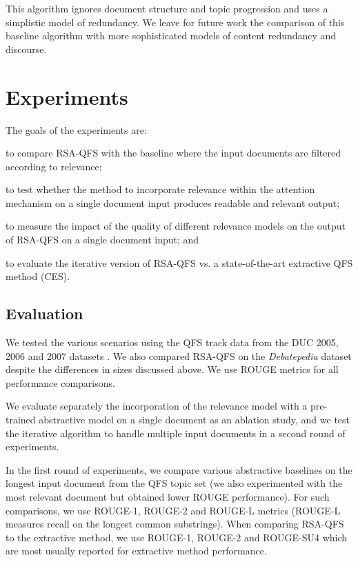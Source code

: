 \documentclass[11pt,a4paper]{article}
\begin{document}
This algorithm ignores document structure and topic progression and uses a simplistic model of redundancy.  We leave for future work the comparison of this baseline algorithm with more sophisticated models of content redundancy and discourse.


\section{Experiments}
The goals of the experiments are: 
\begin {enumerate*} [label=(\itshape\alph*\upshape)]
\item to compare RSA-QFS with the baseline where the input documents are filtered according to relevance;
\item to test whether the method to incorporate relevance within the attention mechanism on a single document input produces readable and relevant output;  
\item to measure the impact of the quality of different relevance models on the output of RSA-QFS on a single document input;
and \item to evaluate the iterative version of RSA-QFS vs. a state-of-the-art extractive QFS method (CES).
\end{enumerate*}

\subsection{Evaluation}

We tested the various scenarios using the QFS track data from the DUC 2005, 2006 and 2007 datasets \cite{dang2005overview,hoa2006overview}.  We also compared RSA-QFS on the \emph{Debatepedia} dataset despite the differences in sizes discussed above. We use ROUGE metrics for all performance comparisons.

We evaluate separately the incorporation of the relevance model with a pre-trained abstractive model on a single document as an ablation study, and we test the iterative algorithm to handle multiple input documents in a second round of experiments.

In the first round of experiments, we compare various abstractive baselines on the longest input document from the QFS topic set (we also experimented with the most relevant document but obtained lower ROUGE performance). For such comparisons, we use ROUGE-1, ROUGE-2 and ROUGE-L metrics (ROUGE-L measures recall on the longest common substrings).  When comparing RSA-QFS to the extractive method, we use ROUGE-1, ROUGE-2 and ROUGE-SU4 which are most usually reported for extractive method performance.
\end{document}
